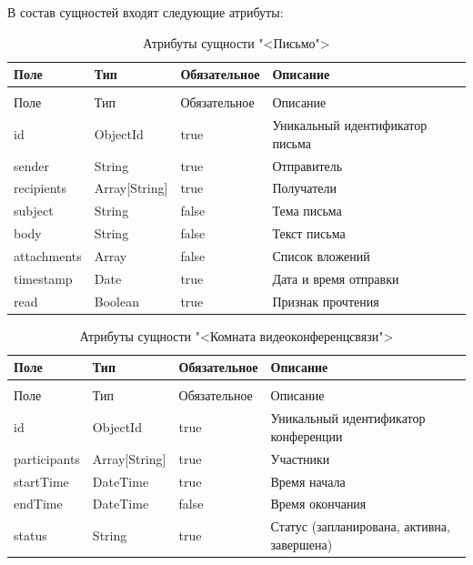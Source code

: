 В состав сущностей входят следующие атрибуты:

\begin{xltabular}{\textwidth}{|l|l|p{3.2cm}|X|}
  \caption{Атрибуты сущности "<Письмо">\label{mail:table}}\\ \hline
  Поле & Тип & Обязательное & Описание \\ \hline
  \endfirsthead
  \\ \hline
  Поле & Тип & Обязательное & Описание \\ \hline
  \endhead
  id & ObjectId & true & Уникальный идентификатор письма \\ \hline
  sender & String & true & Отправитель \\ \hline
  recipients & Array[String] & true & Получатели \\ \hline
  subject & String & false & Тема письма \\ \hline
  body & String & false & Текст письма \\ \hline
  attachments & Array & false & Список вложений \\ \hline
  timestamp & Date & true & Дата и время отправки \\ \hline
  read & Boolean & true & Признак прочтения \\ \hline
\end{xltabular}

\begin{xltabular}{\textwidth}{|l|l|p{3.2cm}|X|}
  \caption{Атрибуты сущности "<Комната видеоконференцсвязи">\label{video:table}}\\ \hline
  Поле & Тип & Обязательное & Описание \\ \hline
  \endfirsthead
  \\ \hline
  Поле & Тип & Обязательное & Описание \\ \hline
  \endhead
  id & ObjectId & true & Уникальный идентификатор конференции \\ \hline
  participants & Array[String] & true & Участники \\ \hline
  startTime & DateTime & true & Время начала \\ \hline
  endTime & DateTime & false & Время окончания \\ \hline
  status & String & true & Статус (запланирована, активна, завершена) \\ \hline
\end{xltabular}

